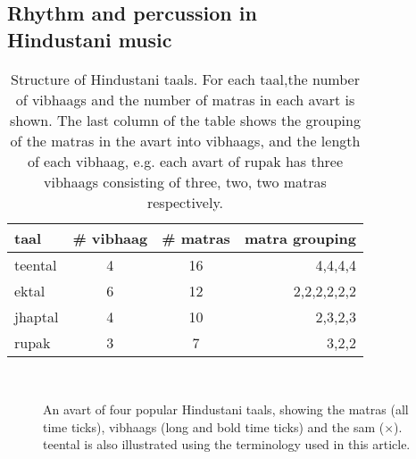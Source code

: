 \subsection[Rhythm and percussion in Hindustani music]{Rhythm and percussion in\\ Hindustani music}
%
%
\begin{table}[t]
\centering
\begin{tabular}{@{}lccr@{}}\toprule
\Gls{taal}  & \# \gls{vibhaag} & \# \glspl{matra} & \gls{matra} grouping \tabularnewline \midrule
\Gls{teental} & 4 & 16 & 4,4,4,4   \tabularnewline
\Gls{ektal} & 6 & 12 & 2,2,2,2,2,2 \tabularnewline
\Gls{jhaptal} & 4 & 10 & 2,3,2,3   \tabularnewline
\Gls{rupak} & 3 & 7 & 3,2,2        \tabularnewline \bottomrule
\end{tabular}
\caption[Structure of Hindustani \glspl{taal}]{Structure of Hindustani \glspl{taal}. For each \gls{taal},the number of \glspl{vibhaag} and the number of \glspl{matra} in each \gls{avart} is shown. The last column of the table shows the grouping of the \glspl{matra} in the \gls{avart} into \glspl{vibhaag}, and the length of each \gls{vibhaag}, e.g. each avart of \gls{rupak} has three \glspl{vibhaag} consisting of three, two, two \glspl{matra} respectively.}\label{tab:hm:taalstruct}
\end{table}
%
\begin{figure}
  \centering
{} \hspace{0.3cm}
\\
 \hspace{1cm}
\caption[Four popular Hindustani \glspl{taal}]{An \gls{avart} of four popular Hindustani \glspl{taal}, showing the \glspl{matra} (all time ticks), \glspl{vibhaag} (long and bold time ticks) and the sam ($\times$). \Gls{teental} is also illustrated using the terminology used in this article.}
\label{fig:taal:hindustani}
\end{figure}
